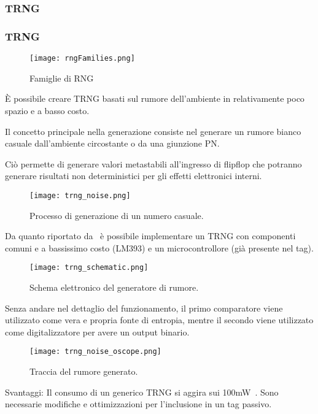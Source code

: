 \subsubsection{TRNG}
\begin{frame}[allowframebreaks]
    \frametitle{TRNG}
    \begin{figure}
        \centering
        \texttt{[image: rngFamilies.png]}
        \caption{Famiglie di RNG}
    \end{figure}
    È possibile creare TRNG basati sul rumore dell'ambiente in relativamente poco spazio e a basso costo.~\cite{fermevc2016low}

    Il concetto principale nella generazione consiste nel generare un rumore bianco casuale dall'ambiente circostante o da una giunzione PN.

    Ciò permette di generare valori metastabili all'ingresso di flipflop 
    che potranno generare risultati non deterministici per gli effetti elettronici interni.

    \begin{figure}
        \centering
        \texttt{[image: trng\_noise.png]}
        \caption{Processo di generazione di un numero casuale.}
    \end{figure}

    Da quanto riportato da~\cite{fermevc2016low} è possibile implementare un TRNG con componenti comuni e a bassissimo costo (LM393) e un microcontrollore (già presente nel tag).

    \begin{figure}
        \centering
        \texttt{[image: trng\_schematic.png]}
        \caption{Schema elettronico del generatore di rumore.\cite{fermevc2016low}}
    \end{figure}

    Senza andare nel dettaglio del funzionamento, il primo comparatore viene utilizzato come vera e propria fonte di entropia, mentre il secondo viene utilizzato come digitalizzatore per avere un output binario.

    \begin{figure}
        \centering
        \texttt{[image: trng\_noise\_oscope.png]}
        \caption{Traccia del rumore generato.\cite{fermevc2016low}}
    \end{figure}

    Svantaggi: Il consumo di un generico TRNG si aggira sui 100mW~\cite{fermevc2016low}. Sono necessarie modifiche e ottimizzazioni per l'inclusione in un tag passivo.
\end{frame}

